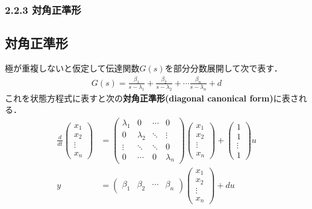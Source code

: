 \begin{frame}[t]
\frametitle{2.2.3 対角正準形}
\subsection{対角正準形}

極が重複しないと仮定して伝達関数$G(s)$を部分分数展開して次で表す．
\begin{align}
 G(s) = \frac{\beta_1}{s-\lambda_1} + \frac{\beta_2}{s-\lambda_2} + \cdots 
        \frac{\beta_n}{s-\lambda_n} + d
\end{align}
これを状態方程式に表すと次の{\bf {対角正準形}(diagonal canonical form)}に表される．
\begin{align}
 \frac{d}{dt}
  \left(\begin{array}{c}
         x_1 \\
	 x_2 \\
	 \vdots \\
	 x_n
	\end{array}\right)
  &=
  \left(\begin{array}{cccc}
     \lambda_1 & 0         & \cdots & 0  \\
	 0         & \lambda_2 & \ddots & \vdots \\
	 \vdots    & \ddots    & \ddots & 0 \\
	 0         & \cdots    & 0      & \lambda_n
	\end{array}\right)
  \left(\begin{array}{c}
	 x_1 \\
	 x_2 \\
	 \vdots \\
	 x_n
	\end{array}\right)
  +
  \left(\begin{array}{c}
     1 \\
	 1 \\
	 \vdots \\
	 1
	\end{array}\right)
  u \label{eq:canoform_d}\\
y &=
 \left(\begin{array}{cccc}
        \beta_1 & \beta_2 & \cdots & \beta_{n}
       \end{array}\right)
 \left(\begin{array}{c}
        x_1 \\
	x_2 \\
	\vdots \\
	x_n
       \end{array}\right)
 + d u
\end{align}
\end{frame}

